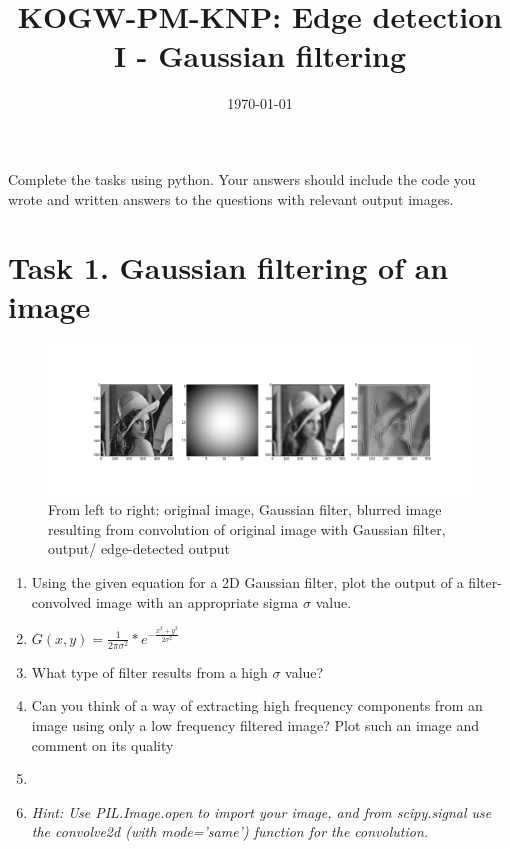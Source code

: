 \documentclass[12pt,english]{scrartcl}
\title{KOGW-PM-KNP: Edge detection I - Gaussian filtering}
\author{}
\date{\today}
\begin{document}

\maketitle

Complete the tasks using python. Your answers should include the code you wrote and written answers to the questions with relevant output images.

\section*{Task 1. Gaussian filtering of an image}

\begin{figure}[htbp]
\includegraphics[width=1.0\textwidth]{Figures/Edge_detection_1/Figure1ED.png}
\caption{From left to right: original image, Gaussian filter, blurred image resulting from convolution of original image with Gaussian filter,   output/ edge-detected output}
\label{fig:lena_gauss}
\end{figure}

\begin{enumerate}
 \item Using the given equation for a 2D Gaussian filter, plot the output of a filter-convolved image with an appropriate sigma $\sigma$ value.
 \item[] $G(x,y) = \frac{1}{2\pi\sigma^2} *e^{-\frac{x^2+y^2}{2\sigma^2}}$
 \item What type of filter results from a high $\sigma$ value? 
 \item Can you think of a way of extracting high frequency components from an image using only a low frequency filtered image? Plot such an image and comment on its quality
 \item[]
 \item[] \textit{Hint: Use PIL.Image.open to import your image, and from scipy.signal use the convolve2d (with mode='same') function for the convolution.}
\end{enumerate}
\end{document}
